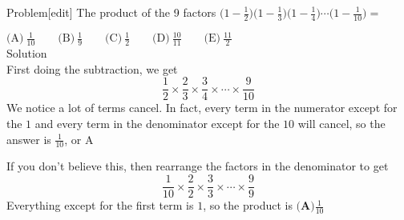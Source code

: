 

Problem[edit]
The product of the 9 factors $\Big(1 - \frac12\Big)\Big(1 - \frac13\Big)\Big(1 - \frac14\Big)\cdots\Big(1 - \frac {1}{10}\Big) =$

$\text{(A)}\ \frac {1}{10} \qquad \text{(B)}\ \frac {1}{9} \qquad \text{(C)}\ \frac {1}{2} \qquad \text{(D)}\ \frac {10}{11} \qquad \text{(E)}\ \frac {11}{2}$
\\
Solution
\\
First doing the subtraction, we get \[\frac{1}{2}\times\frac{2}{3}\times\frac{3}{4}\times\cdots\times\frac{9}{10}\]
We notice a lot of terms cancel. In fact, every term in the numerator except for the $1$ and every term in the denominator except for the $10$ will cancel, so the answer is $\frac{1}{10}$, or $\boxed{\text{A}}$

If you don't believe this, then rearrange the factors in the denominator to get \[\frac{1}{10}\times\frac{2}{2}\times\frac{3}{3}\times\cdots\times\frac{9}{9}\]
Everything except for the first term is $1$, so the product is $\textbf{(A)}\frac{1}{10}$
